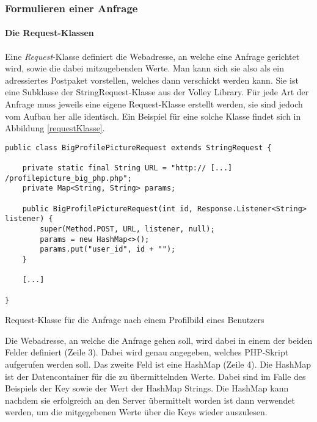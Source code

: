 \documentclass[../main.tex]{subfiles}
\begin{document}
	\subsubsection{Formulieren einer Anfrage}
	
	\paragraph{Die Request-Klassen}
	Eine \emph{Request}-Klasse definiert die Webadresse, an welche eine Anfrage gerichtet wird, sowie die dabei mitzugebenden Werte. Man kann sich sie also als ein adressiertes Postpaket vorstellen, welches dann verschickt werden kann. Sie ist eine Subklasse der StringRequest-Klasse aus der Volley Library. Für jede Art der Anfrage muss jeweils eine eigene Request-Klasse erstellt werden, sie sind jedoch vom Aufbau her alle identisch. Ein Beispiel für eine solche Klasse findet sich in Abbildung \ref{requestKlasse}.
	
\begin{code}
	\begin{center}
		\begin{verbatim}
public class BigProfilePictureRequest extends StringRequest {

	private static final String URL = "http:// [...] /profilepicture_big_php.php";
	private Map<String, String> params;

	public BigProfilePictureRequest(int id, Response.Listener<String> listener) {
		super(Method.POST, URL, listener, null);
		params = new HashMap<>();
		params.put("user_id", id + "");
	}

	[...]
	
}
		\end{verbatim}
		\caption{Request-Klasse für die Anfrage nach einem Profilbild eines Benutzers}
		\label{requestKlasse}
	\end{center}
\end{code}

	Die Webadresse, an welche die Anfrage gehen soll, wird dabei in einem der beiden Felder definiert (Zeile 3). Dabei wird genau angegeben, welches PHP-Skript aufgerufen werden soll. Das zweite Feld ist eine HashMap (Zeile 4). Die HashMap ist der Datencontainer für die zu übermittelnden Werte. Dabei sind im Falle des Beispiels der Key sowie der Wert der HashMap Strings. Die HashMap kann nachdem sie erfolgreich an den Server übermittelt worden ist dann verwendet werden, um die mitgegebenen Werte über die Keys wieder auszulesen.
	
\end{document}
